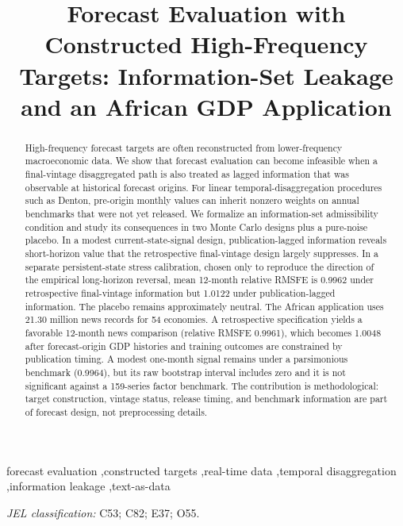 \documentclass[preprint,12pt,authoryear]{elsarticle}
\begin{document}
\begin{frontmatter}
\title{Forecast Evaluation with Constructed High-Frequency Targets: Information-Set Leakage and an African GDP Application}
\begin{abstract}
High-frequency forecast targets are often reconstructed from lower-frequency macroeconomic data. We show that forecast evaluation can become infeasible when a final-vintage disaggregated path is also treated as lagged information that was observable at historical forecast origins. For linear temporal-disaggregation procedures such as Denton, pre-origin monthly values can inherit nonzero weights on annual benchmarks that were not yet released. We formalize an information-set admissibility condition and study its consequences in two Monte Carlo designs plus a pure-noise placebo. In a modest current-state-signal design, publication-lagged information reveals short-horizon value that the retrospective final-vintage design largely suppresses. In a separate persistent-state stress calibration, chosen only to reproduce the direction of the empirical long-horizon reversal, mean 12-month relative RMSFE is 0.9962 under retrospective final-vintage information but 1.0122 under publication-lagged information. The placebo remains approximately neutral. The African application uses 21.30 million news records for 54 economies. A retrospective specification yields a favorable 12-month news comparison (relative RMSFE 0.9961), which becomes 1.0048 after forecast-origin GDP histories and training outcomes are constrained by publication timing. A modest one-month signal remains under a parsimonious benchmark (0.9964), but its raw bootstrap interval includes zero and it is not significant against a 159-series factor benchmark. The contribution is methodological: target construction, vintage status, release timing, and benchmark information are part of forecast design, not preprocessing details.
\end{abstract}
\begin{keyword}
forecast evaluation \sep constructed targets \sep real-time data \sep temporal disaggregation \sep information leakage \sep text-as-data
\par\medskip\textit{JEL classification:} C53; C82; E37; O55.
\end{keyword}
\end{frontmatter}
\singlespacing
\end{document}
